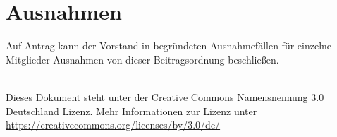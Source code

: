 \documentclass[a4paper, 12pt]{scrartcl}
\begin{document}
\section{Ausnahmen}
Auf Antrag kann der Vorstand in begründeten Ausnahmefällen für einzelne Mitglieder Ausnahmen von dieser Beitragsordnung beschließen.

\vfill

\begin{flushright}
	\ccby \\
	{\small
		Dieses Dokument steht unter der Creative Commons Namensnennung 3.0 Deutschland Lizenz. Mehr Informationen zur Lizenz unter \url{https://creativecommons.org/licenses/by/3.0/de/}
	}
\end{flushright}
\end{document}
